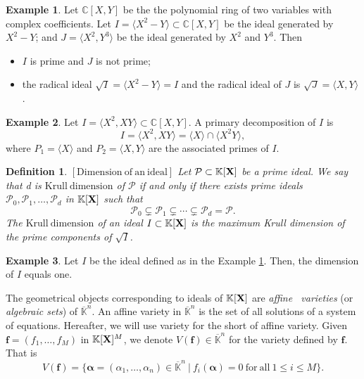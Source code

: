 \documentclass[11pt]{article}
\numberwithin{Property}{section}
\numberwithin{Theorem}{section}
\numberwithin{Proposition}{section}
\numberwithin{Lemma}{section}
\numberwithin{Corollary}{section}
\newtheorem{Definition}{Definition}%
\numberwithin{Definition}{section}
\numberwithin{Remark}{section}
\numberwithin{Conjecture}{section}
\numberwithin{Problem}{section}
\numberwithin{Claim}{section}
\theoremstyle{definition}
\newtheorem{Example}{Example}%
\numberwithin{Example}{section}
\def\f {\ensuremath{\mathbf{f}}}
\renewcommand{\leq}{\leqslant}
\def\bar{\overline}
\newcommand{\field}{\mathbb{K}} %
\newcommand{\mat}[1]{\mathbf{\MakeUppercase{#1}}} %
\begin{document}
\begin{Example}\label{Ex1} Let $\mathbb{C}[X,Y]$ be the the polynomial ring of two variables with complex coefficients. Let $I = \langle X^2 - Y\rangle \subset \mathbb{C}[X,Y]$ be the ideal generated by $X^2 - Y$; and $J = \langle X^2, Y^3\rangle$ be the ideal generated by $X^2$ and $Y^3$. Then 
\begin{itemize}
\item $I$ is prime and $J$ is not prime;
\item the radical ideal $\sqrt{I} = \langle X^2 - Y\rangle = I$ and the radical ideal of $J$ is $\sqrt{J} = \langle X,Y \rangle$. 
\end{itemize}
\end{Example}
\begin{Example}
Let $I = \langle X^2, XY \rangle \subset \mathbb{C}[X,Y]$. A primary decomposition of $I$ is 
\[
I = \langle X^2, XY \rangle = \langle X \rangle \cap \langle X^2Y \rangle, 
\] where $P_1 = \langle X \rangle$ and $P_2 =  \langle X,Y \rangle$ are the associated primes of $I$. 
\end{Example}
\begin{Definition} $\mathrm{[Dimension \ of \ an \ ideal]}$ Let $\mathcal{P} \subset \field[\mat{X}]$ be a prime ideal. We say that d is $\mathrm{Krull \ dimension }$ of $\mathcal{P}$ if and only if there exists prime ideals $\mathcal{P}_0, \mathcal{P}_1, \ldots, \mathcal{P}_d$ in $\field[\mat{X}]$ such that 
\[
\mathcal{P}_0 \subsetneq \mathcal{P}_1 \subsetneq \cdots \subsetneq \mathcal{P}_d = \mathcal{P}.
\] 
The $\mathrm{Krull \ dimension}$ of an ideal $I \subset \field[\mat{X}]$ is the maximum Krull dimension of the prime components of $\sqrt{I}$. 
\end{Definition} 
\begin{Example} Let $I$ be the ideal defined as in the Example \ref{Ex1}. Then, the dimension of $I$ equals one. 
\end{Example}
The geometrical objects corresponding to ideals of $\field[\mat{X}]$ are \emph{affine \ varieties} (or \emph{algebraic sets}) of $\bar{\field}^n$. An affine variety in $\bar{\field}^n$ is the set of all solutions of a system of equations. Hereafter, we will use variety for the short of affine variety. Given $\f = (f_1, \ldots, f_M)$ in $\field[\mat{X}]^M$, we denote $V(\f) \in \bar{\field}^n$ for the variety defined by $\f$. That is 
\[
V(\f) = \{{\bm \alpha} = (\alpha_1, \ldots, \alpha_n) \in \bar{\field}^n \ | \ f_i({\bm \alpha}) = 0 \ \mathrm{for \ all} \ 1 \leq i \leq M\}. 
\]
\end{document}
